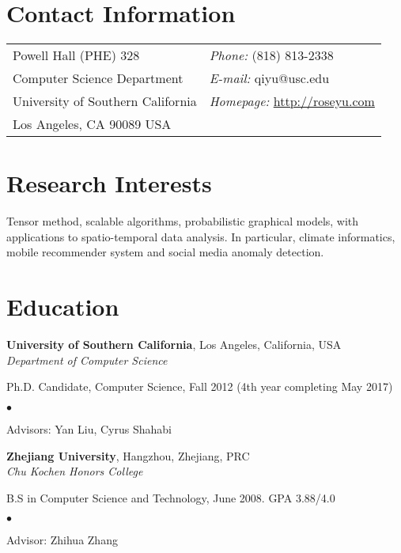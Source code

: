 \documentclass[margin,line]{res}
\newenvironment{list1}{
  \begin{list}{\ding{113}}{%
      \setlength{\itemsep}{0in}
      \setlength{\parsep}{0in} \setlength{\parskip}{0in}
      \setlength{\topsep}{0in} \setlength{\partopsep}{0in} 
      \setlength{\leftmargin}{0.17in}}}{\end{list}}
\newenvironment{list2}{
  \begin{list}{$\bullet$}{%
      \setlength{\itemsep}{0in}
      \setlength{\parsep}{0in} \setlength{\parskip}{0in}
      \setlength{\topsep}{0in} \setlength{\partopsep}{0in} 
      \setlength{\leftmargin}{0.2in}}}{\end{list}}
\begin{document}

\begin{resume}
\section{\sc Contact Information}
\vspace{.05in}
\begin{tabular}{@{}p{2in}p{4in}}
Powell Hall (PHE) 328 & {\it Phone:}  (818) 813-2338 \\            
Computer Science Department  & {\it E-mail:}  qiyu@usc.edu  \\         
University of Southern California & {\it Homepage:} \url{http://roseyu.com} \\       
Los Angeles, CA 90089 USA  & \\     
\end{tabular}


\section{\sc Research Interests}
Tensor method, scalable algorithms, probabilistic graphical  models,  with applications to spatio-temporal data analysis. In particular, climate informatics, mobile recommender system and social media anomaly detection.

\section{\sc Education}
{\bf University of Southern California}, Los Angeles, California, USA\\
{\em Department of Computer Science} 
\begin{list1}
\item[] Ph.D. Candidate, Computer Science,  Fall 2012 (4th year completing May 2017) 
\begin{list2}
\vspace*{.05in}
\item Advisors:  Yan Liu, Cyrus Shahabi
\end{list2}
\vspace*{.05in}
\end{list1}

{\bf Zhejiang University}, Hangzhou, Zhejiang, PRC\\
{\em Chu Kochen Honors College} 
\begin{list1}
\item[] B.S in Computer Science and Technology,  June 2008. GPA 3.88/4.0
\begin{list2}
\vspace*{.05in}
\item Advisor:  Zhihua Zhang
\end{list2}
\end{list1}


\end{resume}
\end{document}
